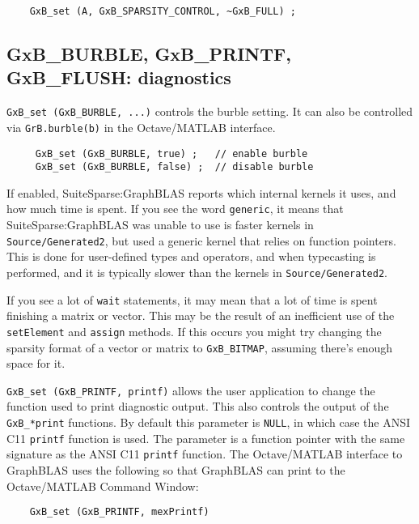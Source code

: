 \documentclass[12pt]{article}
\begin{document}
{\footnotesize
\begin{verbatim}
    GxB_set (A, GxB_SPARSITY_CONTROL, ~GxB_FULL) ; \end{verbatim}}

\subsection{{\sf GxB\_BURBLE}, {\sf GxB\_PRINTF}, {\sf GxB\_FLUSH}: diagnostics}

\verb'GxB_set (GxB_BURBLE, ...)' controls the burble setting.  It can also be
controlled via \verb'GrB.burble(b)' in the Octave/MATLAB interface.

{\footnotesize
\begin{verbatim}
     GxB_set (GxB_BURBLE, true) ;   // enable burble
     GxB_set (GxB_BURBLE, false) ;  // disable burble \end{verbatim}}

If enabled, SuiteSparse:GraphBLAS reports which internal kernels it uses, and
how much time is spent.  If you see the word \verb'generic', it means that
SuiteSparse:GraphBLAS was unable to use is faster kernels in
\verb'Source/Generated2', but used a generic kernel that relies on function
pointers.  This is done for user-defined types and operators, and when
typecasting is performed, and it is typically slower than the kernels in
\verb'Source/Generated2'.

If you see a lot of \verb'wait' statements, it may mean that a lot of time is
spent finishing a matrix or vector.  This may be the result of an inefficient
use of the \verb'setElement' and \verb'assign' methods.  If this occurs you
might try changing the sparsity format of a vector or matrix to
\verb'GxB_BITMAP', assuming there's enough space for it.

\verb'GxB_set (GxB_PRINTF, printf)' allows the user application to change the
function used to print diagnostic output.  This also controls the output of the
\verb'GxB_*print' functions.  By default this parameter is \verb'NULL', in
which case the ANSI C11 \verb'printf' function is used.  The parameter is a
function pointer with the same signature as the ANSI C11 \verb'printf'
function.  The Octave/MATLAB interface to GraphBLAS uses the following so that
GraphBLAS can print to the Octave/MATLAB Command Window:

{\footnotesize
\begin{verbatim}
    GxB_set (GxB_PRINTF, mexPrintf) \end{verbatim}}
\end{document}

